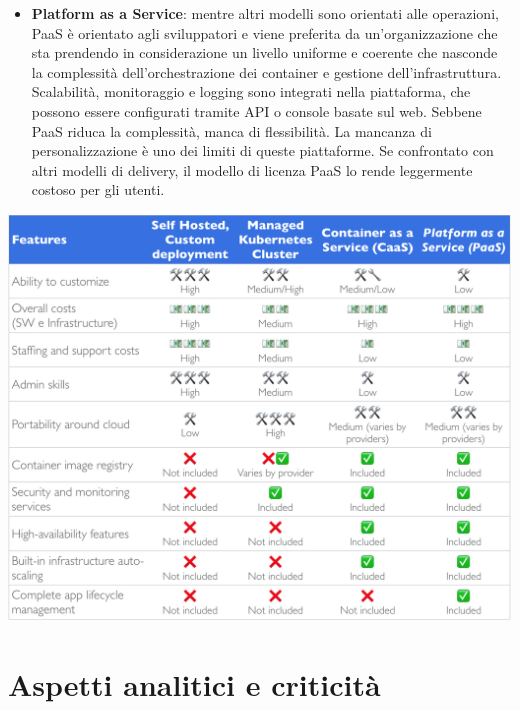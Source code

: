 \documentclass[12pt, a4paper]{report}
\begin{document}
\begin{itemize}
  \item \textbf{Platform as a Service}: mentre altri modelli sono orientati alle operazioni, PaaS è orientato agli sviluppatori e viene preferita da un'organizzazione che sta prendendo in considerazione un livello uniforme e coerente che nasconde la complessità dell'orchestrazione dei container e gestione dell'infrastruttura. Scalabilità, monitoraggio e logging sono integrati nella piattaforma, che possono essere configurati tramite API o console basate sul web. Sebbene PaaS riduca la complessità, manca di flessibilità. La mancanza di personalizzazione è uno dei limiti di queste piattaforme. Se confrontato con altri modelli di delivery, il modello di licenza PaaS lo rende leggermente costoso per gli utenti.
\end{itemize}
\newpage
\begin{center}
  \includegraphics[width=\linewidth]{Images/Kubernetes-deployment}
\end{center}
\chapter{Aspetti analitici e criticità}
\end{document}
